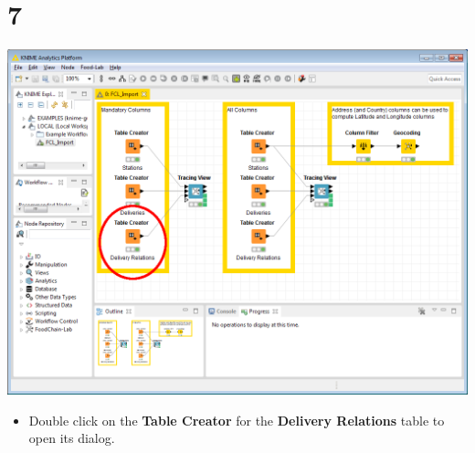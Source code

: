 \documentclass{beamer}
\begin{document}
\section{7}
\begin{frame}
	\begin{center}
  		\includegraphics[height=0.6\textheight]{7.png}
	\end{center}
	\begin{itemize}
		\item Double click on the \textbf{Table Creator} for the \textbf{Delivery Relations} table to open its dialog.
	\end{itemize}
\end{frame}
\end{document}
